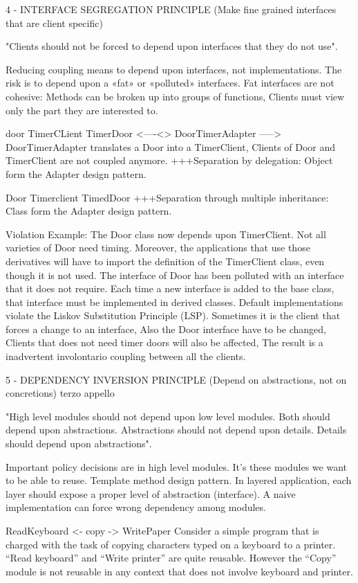 \documentclass{report}
\begin{document}
4 - INTERFACE SEGREGATION PRINCIPLE (Make fine grained interfaces that are client specific)

"Clients should not be forced to depend upon interfaces that they do
not use".

Reducing coupling means to depend upon interfaces, not implementations. The risk is to depend upon a «fat» or «polluted» interfaces. Fat interfaces are not cohesive: Methods can be broken up into groups of functions, Clients must view only the part they are interested to.


  door              TimerCLient
TimerDoor <----<> DoorTimerAdapter 
           ----->
DoorTimerAdapter translates a Door into a TimerClient, Clients of Door and TimerClient are not coupled anymore.
+++Separation by delegation: Object form the Adapter design pattern. 

Door Timerclient
  TimedDoor
+++Separation through multiple inheritance: Class form the Adapter design pattern.

Violation Example: The Door class now depends upon TimerClient. Not all varieties of Door need timing. Moreover, the applications that use those derivatives will have to import the definition of the TimerClient class, even though it is not used. The interface of Door has been polluted with an interface that it does not require. Each time a new interface is added to the base class, that interface must be implemented in derived classes. Default implementations violate the Liskov Substitution Principle (LSP). Sometimes it is the client that forces a change to an interface, Also the Door interface have to be changed, Clients that does not need timer doors will also be affected, The result is a inadvertent involontario coupling between all the clients.

5 - DEPENDENCY INVERSION PRINCIPLE (Depend on abstractions, not on concretions) terzo appello

"High level modules should not depend upon low level modules. Both should depend upon abstractions. Abstractions should not depend upon details. Details should depend upon abstractions".

Important policy decisions are in high level modules. It’s these modules we want to be able to reuse. Template method design pattern.
In layered application, each layer should expose a proper level of abstraction (interface). A naive implementation can force wrong dependency among modules.

ReadKeyboard <- copy -> WritePaper
Consider a simple program that is charged with the task of copying characters typed on a keyboard to a printer. “Read keyboard” and “Write printer” are quite reusable. However the “Copy” module is not reusable in any context that does not involve keyboard and printer.
\end{document}
